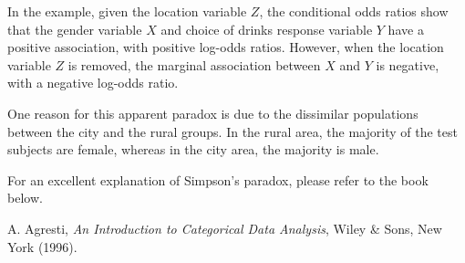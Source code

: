 \documentclass[12pt]{article}
\begin{document}
\par
In the example, given the location variable $Z$, the conditional odds ratios show that the gender variable $X$ and choice of drinks response variable $Y$ have a positive association, with positive log-odds ratios.  However, when the location variable $Z$ is removed, the marginal association between $X$ and $Y$ is negative, with a negative log-odds ratio.
\par
One reason for this apparent paradox is due to the dissimilar populations between the city and the rural groups.  In the rural area, the majority of the test subjects are female, whereas in the city area, the majority is male.
\par
For an excellent explanation of Simpson's paradox, please refer to the book below.
\begin{thebibliography}{8}
 A. Agresti, {\em An Introduction to Categorical Data Analysis}, Wiley \& Sons, New York (1996).
\end{thebibliography}
\end{document}
